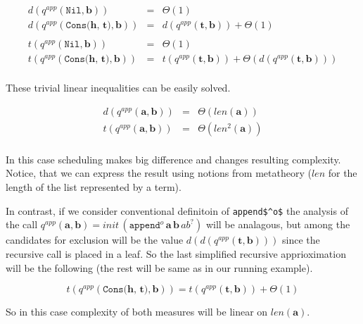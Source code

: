 \[
\begin{array}{lcl}
d(q^{app}(\texttt{Nil}, \mathbf{b})) & = & \Theta(1) \\
d(q^{app}(\texttt{Cons($\mathbf{h}$, $\mathbf{t}$)}, \mathbf{b})) & = & d(q^{app}(\mathbf{t}, \mathbf{b})) + \Theta(1) \\
\\
t(q^{app}(\texttt{Nil}, \mathbf{b})) & = & \Theta(1) \\
t(q^{app}(\texttt{Cons($\mathbf{h}$, $\mathbf{t}$)}, \mathbf{b})) & = & t(q^{app}(\mathbf{t}, \mathbf{b})) + \Theta(d(q^{app}(\mathbf{t}, \mathbf{b}))) \\
\end{array}
 \]
 
These trivial linear inequalities can be easily solved.

\[
\begin{array}{lcl}
d(q^{app}(\mathbf{a}, \mathbf{b})) & = & \Theta(len(\mathbf{a})) \\
t(q^{app}(\mathbf{a}, \mathbf{b})) & = & \Theta(len^2(\mathbf{a})) \\
\end{array}
 \]
 
In this case scheduling makes big difference and changes resulting complexity. Notice, that we can express the result using notions from metatheory ($len$ for the length of the list represented by a term).

In contrast, if we consider conventional definitoin of \lstinline|append$^o$| the analysis of the call $q^{app}(\mathbf{a}, \mathbf{b}) = init\,(\texttt{append$^o$} \, \mathbf{a} \, \mathbf{b} \, ab^?)$ will be analagous, but among the candidates for exclusion will be the value $d(d(q^{app}(\mathbf{t}, \mathbf{b})))$ since the recursive call is placed in a leaf. So the last simplified recursive apprioximation will be the following (the rest will be same as in our running example).

\[ t(q^{app}(\texttt{Cons($\mathbf{h}$, $\mathbf{t}$)}, \mathbf{b})) = t(q^{app}(\mathbf{t}, \mathbf{b})) + \Theta(1) \]

So in this case complexity of both measures will be linear on $len(\mathbf{a})$.
